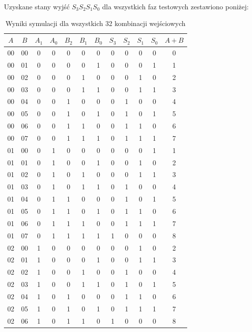 \documentclass[11pt]{article}
\begin{document}
Uzyskane stany wyjść \(S_3S_2S_1S_0\) dla wszystkich faz testowych zestawiono poniżej:
\begin{table}[H]
\centering
\caption{Wyniki symulacji dla wszystkich 32 kombinacji wejściowych}
\label{tab:symulacja}
\setlength{\tabcolsep}{4.5pt}
\begin{tabular}{cc|ccccc|cccc|c}
\hline
\(A\) & \(B\) & \(A_1\) & \(A_0\) & \(B_2\) & \(B_1\) & \(B_0\) & \(S_3\) & \(S_2\) & \(S_1\) & \(S_0\) & \(A{+}B\) \\
\hline
00 & 00 & 0 & 0 & 0 & 0 & 0 & 0 & 0 & 0 & 0 & 0 \\
00 & 01 & 0 & 0 & 0 & 0 & 1 & 0 & 0 & 0 & 1 & 1 \\
00 & 02 & 0 & 0 & 0 & 1 & 0 & 0 & 0 & 1 & 0 & 2 \\
00 & 03 & 0 & 0 & 0 & 1 & 1 & 0 & 0 & 1 & 1 & 3 \\
00 & 04 & 0 & 0 & 1 & 0 & 0 & 0 & 1 & 0 & 0 & 4 \\
00 & 05 & 0 & 0 & 1 & 0 & 1 & 0 & 1 & 0 & 1 & 5 \\
00 & 06 & 0 & 0 & 1 & 1 & 0 & 0 & 1 & 1 & 0 & 6 \\
00 & 07 & 0 & 0 & 1 & 1 & 1 & 0 & 1 & 1 & 1 & 7 \\
01 & 00 & 0 & 1 & 0 & 0 & 0 & 0 & 0 & 0 & 1 & 1 \\
01 & 01 & 0 & 1 & 0 & 0 & 1 & 0 & 0 & 1 & 0 & 2 \\
01 & 02 & 0 & 1 & 0 & 1 & 0 & 0 & 0 & 1 & 1 & 3 \\
01 & 03 & 0 & 1 & 0 & 1 & 1 & 0 & 1 & 0 & 0 & 4 \\
01 & 04 & 0 & 1 & 1 & 0 & 0 & 0 & 1 & 0 & 1 & 5 \\
01 & 05 & 0 & 1 & 1 & 0 & 1 & 0 & 1 & 1 & 0 & 6 \\
01 & 06 & 0 & 1 & 1 & 1 & 0 & 0 & 1 & 1 & 1 & 7 \\
01 & 07 & 0 & 1 & 1 & 1 & 1 & 1 & 0 & 0 & 0 & 8 \\
02 & 00 & 1 & 0 & 0 & 0 & 0 & 0 & 0 & 1 & 0 & 2 \\
02 & 01 & 1 & 0 & 0 & 0 & 1 & 0 & 0 & 1 & 1 & 3 \\
02 & 02 & 1 & 0 & 0 & 1 & 0 & 0 & 1 & 0 & 0 & 4 \\
02 & 03 & 1 & 0 & 0 & 1 & 1 & 0 & 1 & 0 & 1 & 5 \\
02 & 04 & 1 & 0 & 1 & 0 & 0 & 0 & 1 & 1 & 0 & 6 \\
02 & 05 & 1 & 0 & 1 & 0 & 1 & 0 & 1 & 1 & 1 & 7 \\
02 & 06 & 1 & 0 & 1 & 1 & 0 & 1 & 0 & 0 & 0 & 8 \\

\end{tabular}
\end{table}
\end{document}
